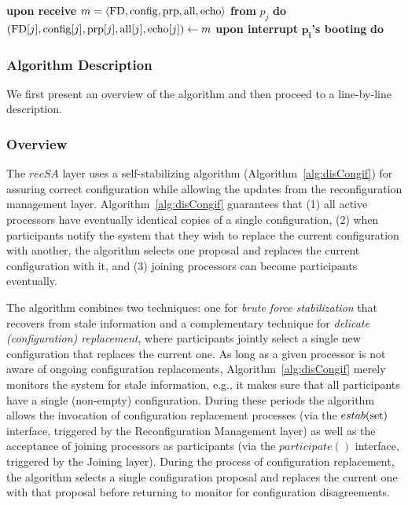 \documentclass[11pt]{article}
\newcommand{\notif}{prp}
\begin{document}
\begin{algorithm*}[t!]
\begin{footnotesize}
{\bf upon receive} $m=\langle \textnormal{FD}, \textnormal{config}, \textnormal{\textnormal{\notif}},  \textnormal{all}, \textnormal{echo} \rangle $ {\bf from} $p_j$ {\bf do} 
$(\textnormal{FD}[j], \textnormal{config}[j], \textnormal{\notif}[j], \textnormal{all}[j], \textnormal{echo}[j]) \gets m$ \label{ln:receive}\;
{\bf upon interrupt} $\bm{p_i}${\bf 's booting} {\bf do} 
\lForEach{$p_k$}{$\textnormal{echo}[k] \gets (\textnormal{config}[k], \textnormal{\notif}[k], \textnormal{all}[k]) \gets (\sharp, dfltNtf, false)$\label{ln:join}}
\end{footnotesize}
\end{algorithm*}









\subsubsection{Algorithm Description}
\label{sec:recSAdescr}




We first present an overview of the algorithm and then proceed to a line-by-line description. 

\subsubsection*{Overview}
The $recSA$ layer uses a self-stabilizing algorithm (Algorithm~\ref{alg:disCongif})  for assuring correct configuration while allowing the updates from the reconfiguration management layer.
Algorithm~\ref{alg:disCongif} guarantees that (1) all active processors have eventually identical copies of a single configuration, (2) when participants notify the system that they wish to replace the current configuration with another, the algorithm selects one proposal and replaces the current configuration with it, and (3) joining processors can become participants eventually. 

The algorithm combines two techniques: one for \emph{brute force stabilization} that recovers from stale information and a complementary technique for \emph{delicate (configuration) replacement}, where participants jointly select a single new configuration that replaces the current one. 
As long as a given processor is not aware of ongoing configuration replacements, Algorithm~\ref{alg:disCongif} merely monitors the system for stale information, e.g., it makes sure that all participants have a single (non-empty) configuration. During these periods the algorithm allows the invocation of configuration replacement processes (via the $estab(\textnormal{set})$ interface, triggered by the Reconfiguration Management layer) as well as the acceptance of joining processors as participants (via the $participate()$ interface, triggered by the Joining layer). During the process of configuration replacement, the algorithm selects a single configuration proposal and replaces the current one with that proposal before returning to monitor for configuration disagreements.
\end{document}
